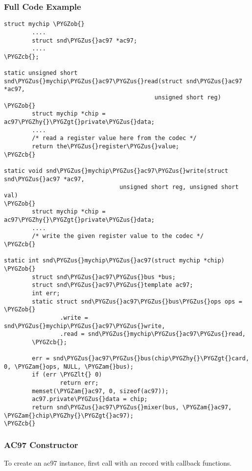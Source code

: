 \documentclass[a4paper,8pt,english]{sphinxmanual}
\def\PYGZus{\char`\_}
\def\PYGZob{\char`\{}
\def\PYGZcb{\char`\}}
\def\PYGZam{\char`\&}
\def\PYGZlt{\char`\<}
\def\PYGZgt{\char`\>}
\def\PYGZhy{\char`\-}
\begin{document}
\subsubsection{Full Code Example}
\label{sound/kernel-api/writing-an-alsa-driver:id6}
\begin{Verbatim}[commandchars=\\\{\}]
struct mychip \PYGZob{}
        ....
        struct snd\PYGZus{}ac97 *ac97;
        ....
\PYGZcb{};

static unsigned short snd\PYGZus{}mychip\PYGZus{}ac97\PYGZus{}read(struct snd\PYGZus{}ac97 *ac97,
                                           unsigned short reg)
\PYGZob{}
        struct mychip *chip = ac97\PYGZhy{}\PYGZgt{}private\PYGZus{}data;
        ....
        /* read a register value here from the codec */
        return the\PYGZus{}register\PYGZus{}value;
\PYGZcb{}

static void snd\PYGZus{}mychip\PYGZus{}ac97\PYGZus{}write(struct snd\PYGZus{}ac97 *ac97,
                                 unsigned short reg, unsigned short val)
\PYGZob{}
        struct mychip *chip = ac97\PYGZhy{}\PYGZgt{}private\PYGZus{}data;
        ....
        /* write the given register value to the codec */
\PYGZcb{}

static int snd\PYGZus{}mychip\PYGZus{}ac97(struct mychip *chip)
\PYGZob{}
        struct snd\PYGZus{}ac97\PYGZus{}bus *bus;
        struct snd\PYGZus{}ac97\PYGZus{}template ac97;
        int err;
        static struct snd\PYGZus{}ac97\PYGZus{}bus\PYGZus{}ops ops = \PYGZob{}
                .write = snd\PYGZus{}mychip\PYGZus{}ac97\PYGZus{}write,
                .read = snd\PYGZus{}mychip\PYGZus{}ac97\PYGZus{}read,
        \PYGZcb{};

        err = snd\PYGZus{}ac97\PYGZus{}bus(chip\PYGZhy{}\PYGZgt{}card, 0, \PYGZam{}ops, NULL, \PYGZam{}bus);
        if (err \PYGZlt{} 0)
                return err;
        memset(\PYGZam{}ac97, 0, sizeof(ac97));
        ac97.private\PYGZus{}data = chip;
        return snd\PYGZus{}ac97\PYGZus{}mixer(bus, \PYGZam{}ac97, \PYGZam{}chip\PYGZhy{}\PYGZgt{}ac97);
\PYGZcb{}
\end{Verbatim}


\subsubsection{AC97 Constructor}
\label{sound/kernel-api/writing-an-alsa-driver:ac97-constructor}
To create an ac97 instance, first call {\hyperref[sound/kernel\string-api/alsa\string-driver\string-api:c.snd_ac97_bus]{\emph{}}}
with an  record with callback functions.
\end{document}
